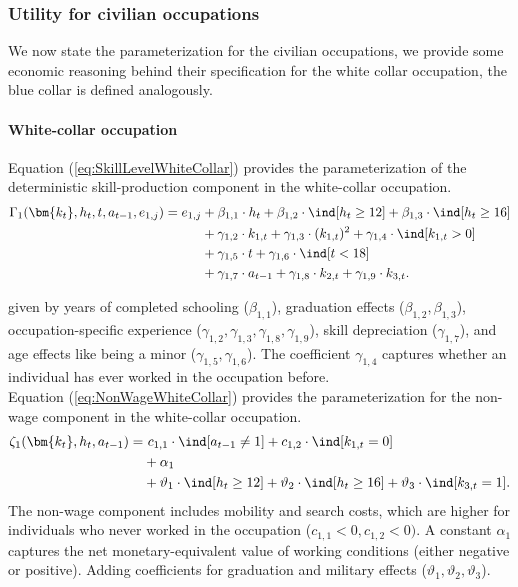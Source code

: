 \subsubsection{Utility for civilian occupations}
We now state the parameterization for the civilian occupations, we provide some economic reasoning behind their specification for the white collar occupation, the blue collar is defined analogously.

\paragraph{White-collar occupation} Equation (\ref{eq:SkillLevelWhiteCollar}) provides the parameterization of the deterministic skill-production component in the white-collar occupation.
%
\begin{align}\label{eq:SkillLevelWhiteCollar}
    \Gamma_1(\bm{k_t}, h_t, t, a_{t-1}, e_{1,j}) = e_{1,j} & + \beta_{1,1} \cdot h_t + \beta_{1, 2} \cdot \ind[h_t \geq 12] + \beta_{1,3} \cdot \ind[h_t\geq 16] \nonumber\\
                                 \nonumber & + \gamma_{1, 2} \cdot  k_{1,t} + \gamma_{1,3} \cdot  (k_{1,t})^2 + \gamma_{1,4} \cdot  \ind[k_{1,t} > 0] \\
                                  \nonumber & + \gamma_{1,5} \cdot  t + \gamma_{1,6} \cdot \ind[t < 18] \nonumber\\
                                  & + \gamma_{1,7} \cdot  a_{t-1} + \gamma_{1,8} \cdot  k_{2,t} + \gamma_{1,9} \cdot  k_{3,t}.
\end{align}
%

given by years of completed schooling ($\beta_{1,1}$), graduation effects ($\beta_{1,2}, \beta_{1,3}$), occupation-specific experience ($\gamma_{1,2}, \gamma_{1,3},  \gamma_{1,8}, \gamma_{1,9}$), skill depreciation ($\gamma_{1,7}$), and age effects like being a minor ($\gamma_{1,5}, \gamma_{1,6}$). The coefficient $\gamma_{1,4}$ captures whether an individual has ever worked in the occupation before.\\

Equation (\ref{eq:NonWageWhiteCollar}) provides the parameterization for the non-wage component in the white-collar occupation.
%
\begin{align}\label{eq:NonWageWhiteCollar}
\zeta_{1}(\bm{k_t}, h_t, a_{t-1}) = &~c_{1,1} \cdot \ind[a_{t-1} \neq 1] + c_{1,2} \cdot \ind[k_{1,t} = 0] \nonumber \\
                            & + \alpha_1 \nonumber \\
                            & + \vartheta_1 \cdot \ind[h_t \geq 12] + \vartheta_2 \cdot \ind[h_t \geq 16] + \vartheta_3 \cdot \ind[k_{3,t} = 1].
\end{align}
%
The non-wage component includes mobility and search costs, which are higher for individuals who never worked in the occupation ($c_{1,1} < 0, c_{1,2}< 0)$. A constant $\alpha_1$ captures the net monetary-equivalent value of working conditions (either negative or positive). Adding coefficients for graduation and military effects ($\vartheta_{1}, \vartheta_{2}, \vartheta_{3}$).

